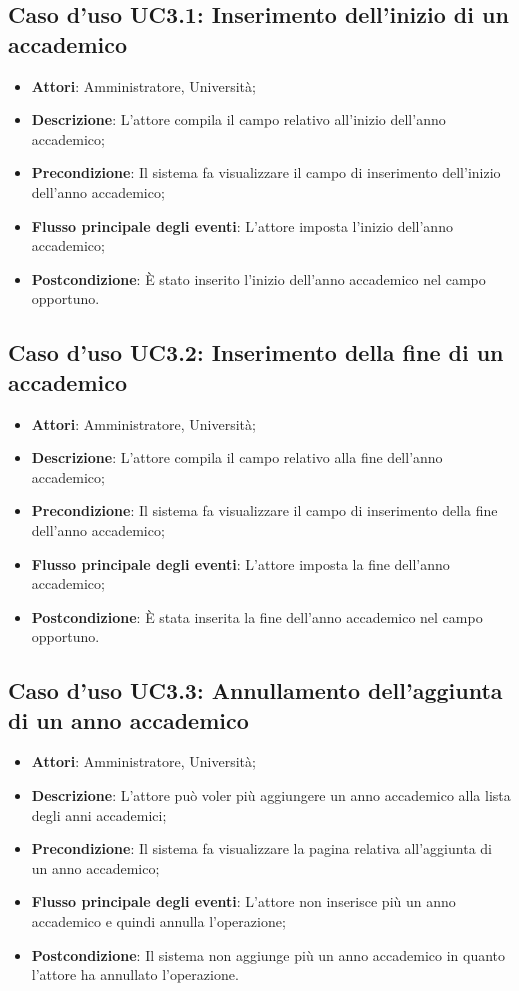 \subsection{Caso d'uso \texorpdfstring{UC3.1}{UC3.1}: Inserimento dell'inizio di un accademico}
\begin{itemize}
	\item \textbf{Attori}: Amministratore, Università;
	\item \textbf{Descrizione}: L'attore compila il campo relativo all'inizio dell'anno accademico;
	\item \textbf{Precondizione}: Il sistema fa visualizzare il campo di inserimento dell'inizio dell'anno accademico;
	\item \textbf{Flusso principale degli eventi}: L'attore imposta l'inizio dell'anno accademico;
	\item \textbf{Postcondizione}: È stato inserito l'inizio dell'anno accademico nel campo opportuno.
\end{itemize}
\subsection{Caso d'uso \texorpdfstring{UC3.2}{UC3.2}: Inserimento della fine di un accademico}
\begin{itemize}
	\item \textbf{Attori}: Amministratore, Università;
	\item \textbf{Descrizione}: L'attore compila il campo relativo alla fine dell'anno accademico;
	\item \textbf{Precondizione}: Il sistema fa visualizzare il campo di inserimento della fine dell'anno accademico;
	\item \textbf{Flusso principale degli eventi}: L'attore imposta la fine dell'anno accademico;
	\item \textbf{Postcondizione}: È stata inserita la fine dell'anno accademico nel campo opportuno.
\end{itemize}
\subsection{Caso d'uso \texorpdfstring{UC3.3}{UC3.3}: Annullamento dell'aggiunta di un anno accademico}
\begin{itemize}
	\item \textbf{Attori}: Amministratore, Università;
	\item \textbf{Descrizione}: L'attore può voler più aggiungere un anno accademico alla lista degli anni accademici;
	\item \textbf{Precondizione}: Il sistema fa visualizzare la pagina relativa all'aggiunta di un anno accademico;
	\item \textbf{Flusso principale degli eventi}: L'attore non inserisce più un anno accademico e quindi annulla l'operazione;
	\item \textbf{Postcondizione}: Il sistema non aggiunge più un anno accademico in quanto l'attore ha annullato l'operazione.
\end{itemize}
